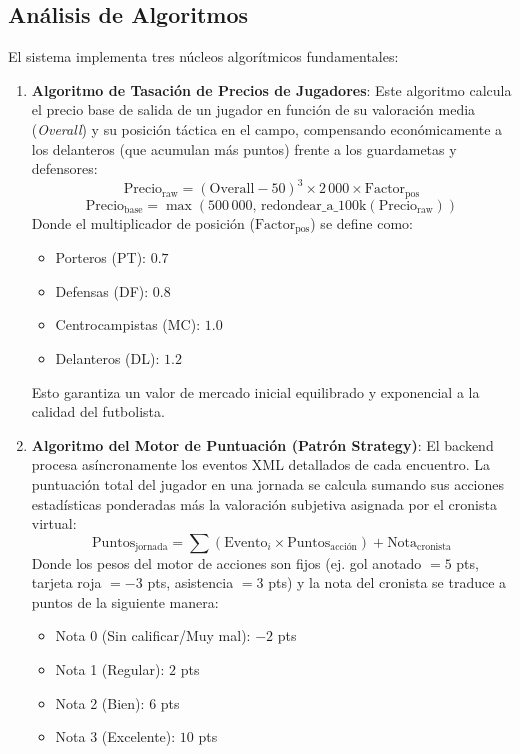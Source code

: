 \subsection{Análisis de Algoritmos}
El sistema implementa tres núcleos algorítmicos fundamentales:
\begin{enumerate}
    \item \textbf{Algoritmo de Tasación de Precios de Jugadores}:
    Este algoritmo calcula el precio base de salida de un jugador en función de su valoración media (\textit{Overall}) y su posición táctica en el campo, compensando económicamente a los delanteros (que acumulan más puntos) frente a los guardametas y defensores:
    \[ \text{Precio}_{\text{raw}} = (\text{Overall} - 50)^3 \times 2\,000 \times \text{Factor}_{\text{pos}} \]
    \[ \text{Precio}_{\text{base}} = \max\left( 500\,000, \, \text{redondear\_a\_100k}(\text{Precio}_{\text{raw}}) \right) \]
    Donde el multiplicador de posición ($\text{Factor}_{\text{pos}}$) se define como:
    \begin{itemize}
        \item Porteros (PT): $0.7$
        \item Defensas (DF): $0.8$
        \item Centrocampistas (MC): $1.0$
        \item Delanteros (DL): $1.2$
    \end{itemize}
    Esto garantiza un valor de mercado inicial equilibrado y exponencial a la calidad del futbolista.

    \item \textbf{Algoritmo del Motor de Puntuación (Patrón Strategy)}:
    El backend procesa asíncronamente los eventos XML detallados de cada encuentro. La puntuación total del jugador en una jornada se calcula sumando sus acciones estadísticas ponderadas más la valoración subjetiva asignada por el cronista virtual:
    \[ \text{Puntos}_{\text{jornada}} = \sum (\text{Evento}_i \times \text{Puntos}_{\text{acción}}) + \text{Nota}_{\text{cronista}} \]
    Donde los pesos del motor de acciones son fijos (ej. gol anotado $= 5$ pts, tarjeta roja $= -3$ pts, asistencia $= 3$ pts) y la nota del cronista se traduce a puntos de la siguiente manera:
    \begin{itemize}
        \item Nota 0 (Sin calificar/Muy mal): $-2$ pts
        \item Nota 1 (Regular): $2$ pts
        \item Nota 2 (Bien): $6$ pts
        \item Nota 3 (Excelente): $10$ pts
    \end{itemize}


\end{enumerate}
